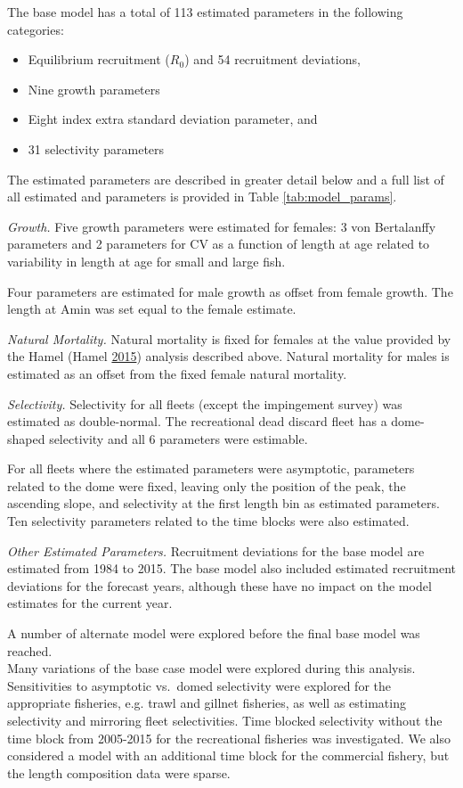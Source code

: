 \documentclass[12pt,]{article}
\begin{document}
The base model has a total of 113 estimated parameters in the following
categories:

\begin{itemize}
  \item Equilibrium recruitment ($R_0$) and 54 recruitment deviations,
  \item Nine growth parameters
  \item Eight index extra standard deviation parameter, and
  \item 31 selectivity parameters
\end{itemize}

The estimated parameters are described in greater detail below and a
full list of all estimated and parameters is provided in Table
\ref{tab:model_params}.

\emph{Growth.} Five growth parameters were estimated for females: 3 von
Bertalanffy parameters and 2 parameters for CV as a function of length
at age related to variability in length at age for small and large fish.

Four parameters are estimated for male growth as offset from female
growth. The length at Amin was set equal to the female estimate.

\emph{Natural Mortality.} Natural mortality is fixed for females at the
value provided by the Hamel (Hamel
\protect\hyperlink{ref-Hamel2015}{2015}) analysis described above.
Natural mortality for males is estimated as an offset from the fixed
female natural mortality.

\emph{Selectivity.} Selectivity for all fleets (except the impingement
survey) was estimated as double-normal. The recreational dead discard
fleet has a dome-shaped selectivity and all 6 parameters were estimable.

For all fleets where the estimated parameters were asymptotic,
parameters related to the dome were fixed, leaving only the position of
the peak, the ascending slope, and selectivity at the first length bin
as estimated parameters. Ten selectivity parameters related to the time
blocks were also estimated.

\emph{Other Estimated Parameters.} Recruitment deviations for the base
model are estimated from 1984 to 2015. The base model also included
estimated recruitment deviations for the forecast years, although these
have no impact on the model estimates for the current year.

A number of alternate model were explored before the final base model
was reached.\\
Many variations of the base case model were explored during this
analysis. Sensitivities to asymptotic vs.~domed selectivity were
explored for the appropriate fisheries, e.g. trawl and gillnet
fisheries, as well as estimating selectivity and mirroring fleet
selectivities. Time blocked selectivity without the time block from
2005-2015 for the recreational fisheries was investigated. We also
considered a model with an additional time block for the commercial
fishery, but the length composition data were sparse.
\end{document}
